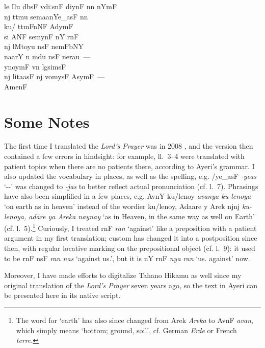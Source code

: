 \documentclass[12pt,paper=a4]{scrartcl}
\newcommand{\fw}[1]{\textit{#1}} %
\newcommand{\tit}[1]{\textit{#1}} %
\newcommand{\qq}[1]{\enquote*{#1}} %
\newcommand{\ayr}[1]{{\Tagati #1}}
\newenvironment{ayeri}{
    \Tagati
}{
}
\begin{document}
\begin{raggedright}
\begin{multicols}{2}
\begin{ayeri}
\begin{linenumbers*}
le Ilu dbsF vdiːsnF diynF nn nYmF \\
nj ttmu semaanYe\_asF nn \\
ku/ ttmFnNF AdymF \\
si ANF semynF nY rnF \\
nj lMtoyu nsF nemFbNY \\
naarY n mdu nsF nerau~— \\ [0.5\baselineskip]

ynoymF vn lgsimsF \\
nj litaasF nj vomysF AsymF~— \\ [0.5\baselineskip]

AmenF

\end{linenumbers*}

\end{ayeri}
\end{multicols}
\end{raggedright}

\section{Some Notes}
The first time I translated the \tit{Lord's Prayer} was in 2008 
\parencite[cf.][]{becker2008}, and the version then contained a few errors in 
hindsight: for example, ll.~3--4 were translated with patient topics when there 
are no patients there, according to Ayeri's grammar. I also updated the 
vocabulary in places, as well as the spelling, e.g. \ayr{/ye\_asF} \fw{-yeas} 
\qq{-\Pl{}-\Parg{}} was changed to \fw{-jas} to better reflect actual 
pronunciation (cf. l.~7). Phrasings have also been simplified in a few places, 
e.g. \ayr{AvnY ku/lenoy} \fw{avanya ku-lenoya} `on earth as in heaven' instead 
of the wordier \ayr{ku/lenoy, Adaare y Arek njnj} \fw{ku-lenoya, adāre 
ya Areka naynay} `as in Heaven, in the same way as well on Earth' (cf. 
l.~5).\footnote{The word for `earth' has also since changed from \ayr{Arek} 
\fw{Areka} to \ayr{AvnF} \fw{avan}, which simply means `bottom; ground, soil', 
cf. German \fw{Erde} or French \fw{terre}.} Curiously, I treated \ayr{rnF} 
\fw{ran} `against' like a preposition with a patient argument in my first 
translation; custom has changed it into a postposition since then, with regular 
locative marking on the prepositional object (cf. l.~9): it used to be 
\ayr{rnF nsF} \fw{ran nas} `against us.\Parg{}', but it is \ayr{nY rnF} 
\fw{nya ran} `us.\Loc{} against' now.

Moreover, I have made efforts to digitalize Tahano Hikamu as well since my 
original translation of the \tit{Lord's Prayer} seven years ago, so the text 
in Ayeri can be presented here in its native script.
\end{document}
